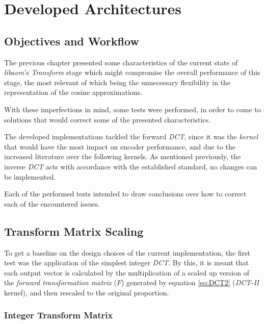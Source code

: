 \cleardoublepage
\chapter{Developed Architectures}

\section{Objectives and Workflow}

The previous chapter presented some characteristics of the current state of \emph{libaom}'s \emph{Transform} stage which might compromise the overall performance of this stage, the most relevant of which being the unnecessary flexibility in the representation of the cosine approximations.

With these imperfections in mind, some tests were performed, in order to come to solutions that would correct some of the presented characteristics.

The developed implementations tackled the forward \emph{DCT}, since it was the \emph{kernel} that would have the most impact on encoder performance, and due to the increased literature over the following kernels. As mentioned previously, the inverse \emph{DCT} acts with accordance with the established standard, no changes can be implemented.

Each of the performed tests intended to draw conclusions over how to correct each of the encountered issues.

\section{Transform Matrix Scaling}

To get a baseline on the design choices of the current implementation, the first test was the application of the simplest integer \emph{DCT}. By this, it is meant that each output vector is calculated by the multiplication of a scaled up version of the \emph{forward transformation matrix} ($F$) generated by equation \ref{eq:DCT2} (\emph{DCT-II} kernel), and then rescaled to the original proportion.

\subsection{Integer Transform Matrix}

